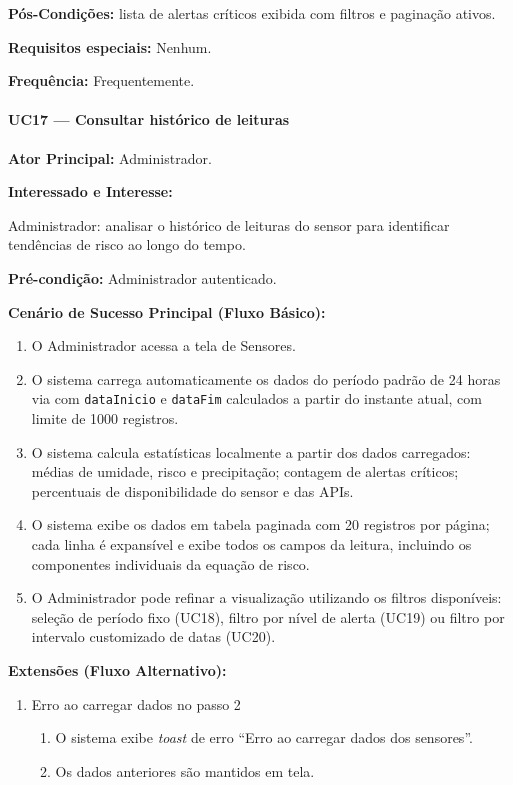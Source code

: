 \textbf{Pós-Condições:} lista de alertas críticos exibida
com filtros e paginação ativos.

\textbf{Requisitos especiais:} Nenhum.

\textbf{Frequência:} Frequentemente.

\paragraph{UC17 --- Consultar histórico de leituras}\hfill\break

\textbf{Ator Principal:} Administrador.

\textbf{Interessado e Interesse:}

Administrador: analisar o histórico de leituras do sensor
para identificar tendências de risco ao longo do tempo.

\textbf{Pré-condição:} Administrador autenticado.

\textbf{Cenário de Sucesso Principal (Fluxo Básico):}
\begin{enumerate}
  \item O Administrador acessa a tela de Sensores.
  \item O sistema carrega automaticamente os dados do
        período padrão de 24 horas via
         com
        \texttt{dataInicio} e \texttt{dataFim} calculados
        a partir do instante atual, com limite de
        1000 registros.
  \item O sistema calcula estatísticas localmente a partir
        dos dados carregados: médias de umidade, risco e
        precipitação; contagem de alertas críticos;
        percentuais de disponibilidade do sensor e das
        APIs.
  \item O sistema exibe os dados em tabela paginada com
        20 registros por página; cada linha é expansível
        e exibe todos os campos da leitura, incluindo os
        componentes individuais da equação de risco.
  \item O Administrador pode refinar a visualização
        utilizando os filtros disponíveis: seleção de
        período fixo (UC18), filtro por nível de alerta
        (UC19) ou filtro por intervalo customizado de
        datas (UC20).
\end{enumerate}

\textbf{Extensões (Fluxo Alternativo):}

\begin{enumerate}
  \renewcommand{\theenumi}{2a}
  \renewcommand{\labelenumi}{\theenumi.}
  \item Erro ao carregar dados no passo 2
  \begin{enumerate}
  \item O sistema exibe \textit{toast} de erro
        ``Erro ao carregar dados dos sensores''.
  \item Os dados anteriores são mantidos em tela.
  \end{enumerate}
\end{enumerate}

